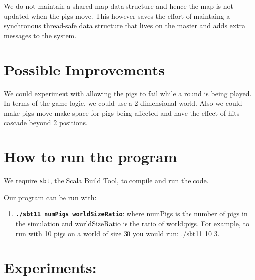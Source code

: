 \documentclass[]{article}
\begin{document}
We do not maintain a shared map data structure and hence the map is not updated
when the pigs move. This however saves the effort of maintaing a synchronous
thread-safe data structure that lives on the master and adds extra messages to
the system.

\section{Possible Improvements}

We could experiment with allowing the pigs to fail while a round is being played. 
In terms of the game logic, we could use a 2
dimensional world. Also we could make pigs move make space for pigs
being affected and have the effect of hits cascade beyond 2 positions.

\section{How to run the program}

We require \texttt{sbt}, the Scala Build Tool, to compile and run the code.

Our program can be run with:

\begin{enumerate}[1.]
\item
  \textbf{\texttt{./sbt11 numPigs worldSizeRatio}}: where numPigs is the number of pigs in the simulation and worldSizeRatio is the ratio of world:pigs. For example, to run with 10 pigs on a world of size 30 you would run: ./sbt11 10 3.
\end{enumerate}

\pagebreak

\section{Experiments:}
\end{document}
